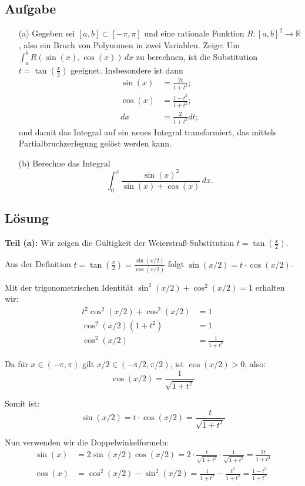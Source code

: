 \documentclass{article}
\begin{document}
\subsection*{Aufgabe}
\begin{enumerate}
\item[(a)] Gegeben sei $[a,b]\subset[-\pi,\pi]$ und eine rationale Funktion $R:[a,b]^2\to \mathbb{R}$, also ein Bruch von Polynomen in zwei Variablen. Zeige: Um $\int_a^b R(\sin(x),\cos(x))\,dx$ zu berechnen, ist die Substitution $t=\tan(\frac{x}{2})$ geeignet. Insbesondere ist dann 
\begin{equation*}
\begin{split}
\sin(x)&=\frac{2t}{1+t^2};\\
\cos(x)&=\frac{1-t^2}{1+t^2};\\
dx&=\frac{2}{1+t^2}dt;
\end{split}
\end{equation*}
und damit das Integral auf ein neues Integral transformiert, das mittels Partialbruchzerlegung gelöst werden kann.
\item[(b)] Berechne das Integral 
$$\int_0^\pi \frac{\sin(x)^2}{\sin(x)+\cos(x)}\,dx.$$
\end{enumerate}

\subsection*{Lösung}

\textbf{Teil (a):} Wir zeigen die Gültigkeit der Weierstraß-Substitution $t = \tan\left(\frac{x}{2}\right)$.

Aus der Definition $t = \tan\left(\frac{x}{2}\right) = \frac{\sin(x/2)}{\cos(x/2)}$ folgt $\sin(x/2) = t \cdot \cos(x/2)$.

Mit der trigonometrischen Identität $\sin^2(x/2) + \cos^2(x/2) = 1$ erhalten wir:
\begin{align}
t^2 \cos^2(x/2) + \cos^2(x/2) &= 1\\
\cos^2(x/2)(1 + t^2) &= 1\\
\cos^2(x/2) &= \frac{1}{1 + t^2}
\end{align}

Da für $x \in (-\pi, \pi)$ gilt $x/2 \in (-\pi/2, \pi/2)$, ist $\cos(x/2) > 0$, also:
$$\cos(x/2) = \frac{1}{\sqrt{1 + t^2}}$$

Somit ist:
$$\sin(x/2) = t \cdot \cos(x/2) = \frac{t}{\sqrt{1 + t^2}}$$

Nun verwenden wir die Doppelwinkelformeln:
\begin{align}
\sin(x) &= 2\sin(x/2)\cos(x/2) = 2 \cdot \frac{t}{\sqrt{1 + t^2}} \cdot \frac{1}{\sqrt{1 + t^2}} = \frac{2t}{1 + t^2}\\
\cos(x) &= \cos^2(x/2) - \sin^2(x/2) = \frac{1}{1 + t^2} - \frac{t^2}{1 + t^2} = \frac{1 - t^2}{1 + t^2}
\end{align}
\end{document}
